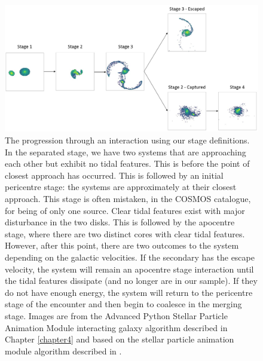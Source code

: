 \begin{figure}
\centering
\includegraphics[width=\textwidth]{Chapter3/figures/stage-evolution.jpg}
\caption[The progression through an interaction using our stage definitions.]{The progression through an interaction using our stage definitions. In the separated stage, we have two systems that are approaching each other but exhibit no tidal features. This is before the point of closest approach has occurred. This is followed by an initial pericentre stage: the systems are approximately at their closest approach. This stage is often mistaken, in the COSMOS catalogue, for being of only one source. Clear tidal features exist with major disturbance in the two disks. This is followed by the apocentre stage, where there are two distinct cores with clear tidal features. However, after this point, there are two outcomes to the system depending on the galactic velocities. If the secondary has the escape velocity, the system will remain an apocentre stage interaction until the tidal features dissipate (and no longer are in our sample). If they do not have enough energy, the system will return to the pericentre stage of the encounter and then begin to coalesce in the merging stage. Images are from the Advanced Python Stellar Particle Animation Module interacting galaxy algorithm described in Chapter \ref{chapter4} and based on the stellar particle animation module algorithm described in \citet{2016A&C....16...26W}.}
\label{fig:illustration}
\end{figure}

